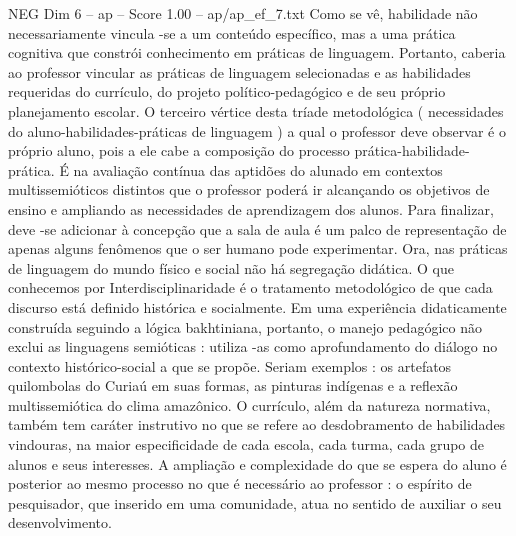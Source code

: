\begin{textsample}{NEG Dim 6 – ap – Score 1.00 – ap/ap\_ef\_7.txt}
Como se vê, habilidade não necessariamente vincula -se a um conteúdo específico, mas a uma prática cognitiva que constrói conhecimento em práticas de linguagem.
Portanto, caberia ao professor vincular as práticas de linguagem selecionadas e as habilidades requeridas do currículo, do projeto político-pedagógico e de seu próprio planejamento escolar.
O terceiro vértice desta tríade metodológica ( necessidades do aluno-habilidades-práticas de linguagem ) a qual o professor deve observar é o próprio aluno, pois a ele cabe a composição do processo prática-habilidade-prática.
É na avaliação contínua das aptidões do alunado em contextos multissemióticos distintos que o professor poderá ir alcançando os objetivos de ensino e ampliando as necessidades de aprendizagem dos alunos.
Para finalizar, deve -se adicionar à concepção que a sala de aula é um palco de representação de apenas alguns fenômenos que o ser humano pode experimentar.
Ora, nas práticas de linguagem do mundo físico e social não há segregação didática.
O que conhecemos por Interdisciplinaridade é o tratamento metodológico de que cada discurso está definido histórica e socialmente.
Em uma experiência didaticamente construída seguindo a lógica bakhtiniana, portanto, o manejo pedagógico não exclui as linguagens semióticas : utiliza -as como aprofundamento do diálogo no contexto histórico-social a que se propõe.
Seriam exemplos : os artefatos quilombolas do Curiaú em suas formas, as pinturas indígenas e a reflexão multissemiótica do clima amazônico.
O currículo, além da natureza normativa, também tem caráter instrutivo no que se refere ao desdobramento de habilidades vindouras, na maior especificidade de cada escola, cada turma, cada grupo de alunos e seus interesses.
A ampliação e complexidade do que se espera do aluno é posterior ao mesmo processo no que é necessário ao professor : o espírito de pesquisador, que inserido em uma comunidade, atua no sentido de auxiliar o seu desenvolvimento.

\end{textsample}
